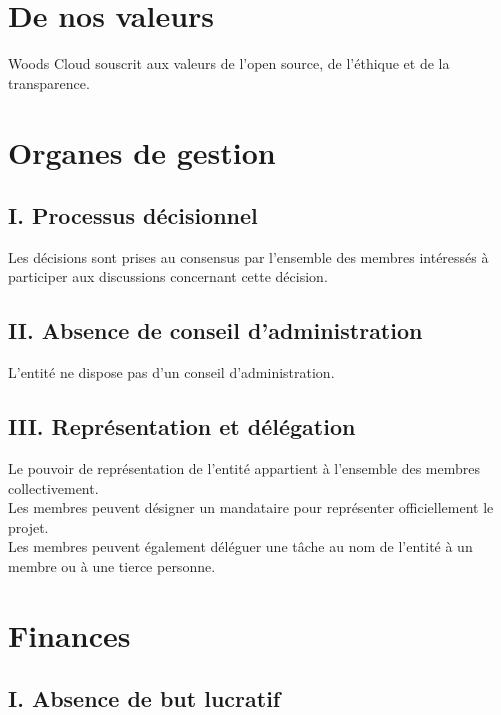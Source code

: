 \documentclass[10pt, a4paper]{article}
\begin{document}
\section*{De nos valeurs}

Woods Cloud souscrit aux valeurs de l'open source, de l'éthique et de la transparence.

\newpage{}

\section*{Organes de gestion}

\subsection*{I. Processus décisionnel}

Les décisions sont prises au consensus par l'ensemble des membres intéressés à participer aux discussions concernant cette décision.

\subsection*{II. Absence de conseil d'administration}

L'entité ne dispose pas d'un conseil d'administration.

\subsection*{III. Représentation et délégation}

Le pouvoir de représentation de l'entité appartient à l'ensemble des membres collectivement.\\

Les membres peuvent désigner un mandataire pour représenter officiellement le projet.\\

Les membres peuvent également déléguer une tâche au nom de l'entité à un membre ou à une tierce personne.

\section*{Finances}

\subsection*{I. Absence de but lucratif}
\end{document}
